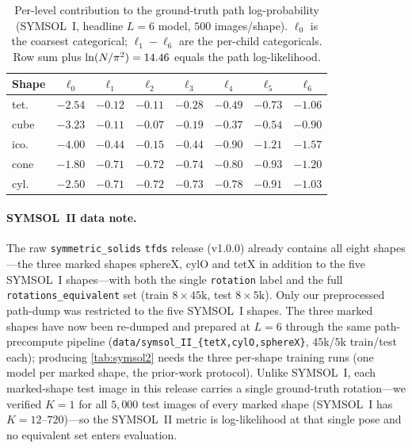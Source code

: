 \begin{table}[h]
\centering
\caption{Per-level contribution to the ground-truth path log-probability
(SYMSOL~I, headline $L{=}6$ model, $500$ images/shape). $\ell_0$ is the coarsest
categorical; $\ell_1\!-\!\ell_6$ are the per-child categoricals. Row sum plus
$\ln(N/\pi^2)=14.46$ equals the path log-likelihood.}
\label{tab:supp-perlevel}
\small
\setlength{\tabcolsep}{4pt}
\begin{tabular}{l ccccccc}
\toprule
Shape & $\ell_0$ & $\ell_1$ & $\ell_2$ & $\ell_3$ & $\ell_4$ & $\ell_5$ & $\ell_6$ \\
\midrule
tet.  & $-2.54$ & $-0.12$ & $-0.11$ & $-0.28$ & $-0.49$ & $-0.73$ & $-1.06$ \\
cube  & $-3.23$ & $-0.11$ & $-0.07$ & $-0.19$ & $-0.37$ & $-0.54$ & $-0.90$ \\
ico.  & $-4.00$ & $-0.44$ & $-0.15$ & $-0.44$ & $-0.90$ & $-1.21$ & $-1.57$ \\
cone  & $-1.80$ & $-0.71$ & $-0.72$ & $-0.74$ & $-0.80$ & $-0.93$ & $-1.20$ \\
cyl.  & $-2.50$ & $-0.71$ & $-0.72$ & $-0.73$ & $-0.78$ & $-0.91$ & $-1.03$ \\
\bottomrule
\end{tabular}
\end{table}

\paragraph{SYMSOL~II data note.}
The raw \texttt{symmetric\_solids} \texttt{tfds} release (v1.0.0) already contains
all eight shapes---the three marked shapes sphereX, cylO and tetX in addition to
the five SYMSOL~I shapes---with both the single \texttt{rotation} label and the
full \texttt{rotations\_equivalent} set (train $8\times45\mathrm{k}$, test
$8\times5\mathrm{k}$). Only our preprocessed path-dump was restricted to the five
SYMSOL~I shapes. The three marked shapes have now been re-dumped and prepared at
$L{=}6$ through the same path-precompute pipeline
(\texttt{data/symsol\_II\_\{tetX,cylO,sphereX\}}, $45$k/$5$k train/test each);
producing \cref{tab:symsol2} needs the three per-shape training runs (one model per
marked shape, the prior-work protocol). Unlike SYMSOL~I, each marked-shape test
image in this release carries a single ground-truth rotation---we verified
$K{=}1$ for all $5{,}000$ test images of every marked shape (SYMSOL~I has
$K{=}12$--$720$)---so the SYMSOL~II metric is log-likelihood at that single pose
and no equivalent set enters evaluation.


